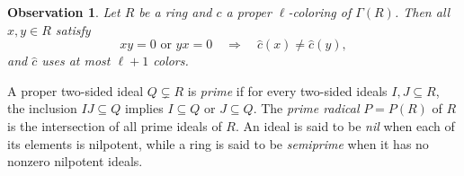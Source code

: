 \documentclass[a4paper,11pt]{amsart}
\newtheorem{obs}[obs]{Observation}
\theoremstyle{definition}
\begin{document}
\begin{obs}\label{obs:hat}
Let $R$ be a ring and $c$ a proper $\ell$-coloring of $\Gamma(R)$. Then all $x,y\in R$ satisfy
\begin{equation}\label{eq:extended-coloring}
    xy=0\text{ or }yx=0
    \quad\Longrightarrow\quad
    \widehat c(x)\ne\widehat c(y),
\end{equation} 
and $\widehat c$ uses at most
$\ell+1$ colors.
\end{obs}

A proper two-sided ideal $Q\subsetneq R$ is \emph{prime} if for every two-sided ideals
$I,J\subseteq R$, the inclusion $IJ\subseteq Q$ implies $I\subseteq Q$ or
$J\subseteq Q$. The \emph{prime radical} $P=P(R)$ of $R$ is the intersection of all
prime ideals of $R$. An ideal is said to be \emph{nil} when each of its elements is nilpotent, while a ring is said to be \emph{semiprime} when it has no nonzero nilpotent ideals. 
\end{document}
